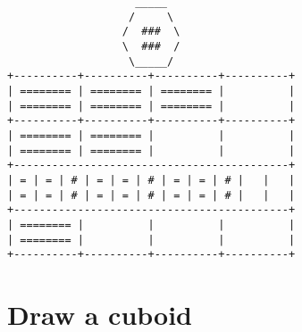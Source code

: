 \begin{verbatim}
                    _____
                   /     \
                  /  ###  \
                  \  ###  /
                   \_____/
+----------+----------+----------+----------+
| ======== | ======== | ======== |          |
| ======== | ======== | ======== |          |
+----------+----------+----------+----------+
| ======== | ======== |          |          |
| ======== | ======== |          |          |
+-------------------------------------------+
| = | = | # | = | = | # | = | = | # |   |   |
| = | = | # | = | = | # | = | = | # |   |   |
+-------------------------------------------+
| ======== |          |          |          |
| ======== |          |          |          |
+----------+----------+----------+----------+

\end{verbatim}

\section*{Draw a cuboid}

